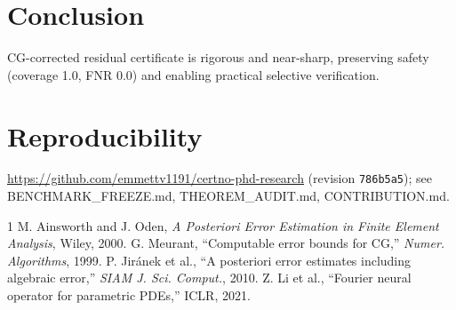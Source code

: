 \documentclass[conference]{IEEEtran}
\theoremstyle{definition}
\begin{document}
\section{Conclusion}
CG-corrected residual certificate is rigorous and near-sharp, preserving safety (coverage 1.0, FNR 0.0) and enabling practical selective verification.

\section*{Reproducibility}
\url{https://github.com/emmettv1191/certno-phd-research} (revision \texttt{786b5a5}); see BENCHMARK\_FREEZE.md, THEOREM\_AUDIT.md, CONTRIBUTION.md.

\begin{thebibliography}{1}
 M. Ainsworth and J. Oden, \emph{A Posteriori Error Estimation in Finite Element Analysis}, Wiley, 2000.
 G. Meurant, ``Computable error bounds for CG,'' \emph{Numer. Algorithms}, 1999.
 P. Jir\'anek et al., ``A posteriori error estimates including algebraic error,'' \emph{SIAM J. Sci. Comput.}, 2010.
 Z. Li et al., ``Fourier neural operator for parametric PDEs,'' ICLR, 2021.
\end{thebibliography}
\end{document}

